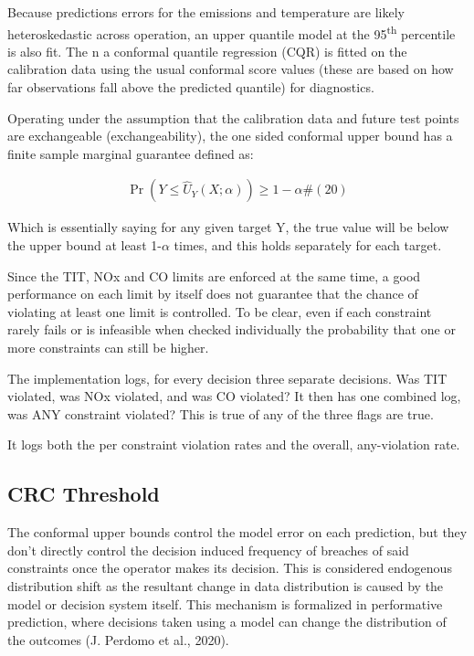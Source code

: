 \documentclass[11pt]{article}
\begin{document}
Because predictions errors for the emissions and temperature are likely
heteroskedastic across operation, an upper quantile model at the
95\textsuperscript{th} percentile is also fit. The n a conformal
quantile regression (CQR) is fitted on the calibration data using the
usual conformal score values (these are based on how far observations
fall above the predicted quantile) for diagnostics.

Operating under the assumption that the calibration data and future test
points are exchangeable (exchangeability), the one sided conformal upper
bound has a finite sample marginal guarantee defined as:

\[\begin{array}{r}
\Pr\left( Y \leq {\widehat{U}}_{Y}(X;\alpha) \right) \geq 1 - \alpha\#(20)
\end{array}\]

Which is essentially saying for any given target Y, the true value will
be below the upper bound at least 1-\(\alpha\) times, and this holds
separately for each target.

Since the TIT, NOx and CO limits are enforced at the same time, a good
performance on each limit by itself does not guarantee that the chance
of violating at least one limit is controlled. To be clear, even if each
constraint rarely fails or is infeasible when checked individually the
probability that one or more constraints can still be higher.

The implementation logs, for every decision three separate decisions.
Was TIT violated, was NOx violated, and was CO violated? It then has one
combined log, was ANY constraint violated? This is true of any of the
three flags are true.

It logs both the per constraint violation rates and the overall,
any-violation rate.

\subsection{CRC Threshold}\label{crc-threshold}

The conformal upper bounds control the model error on each prediction,
but they don't directly control the decision induced frequency of
breaches of said constraints once the operator makes its decision. This
is considered endogenous distribution shift as the resultant change in
data distribution is caused by the model or decision system itself. This
mechanism is formalized in performative prediction, where decisions
taken using a model can change the distribution of the outcomes (J.
Perdomo et al., 2020).
\end{document}
